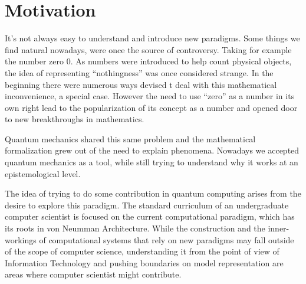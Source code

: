 \section{Motivation}
\label{sec:int_motivation}



It's not always easy to understand and introduce new paradigms. Some things we find natural nowadays, were once the source of controversy. Taking for example the number zero $0$. As numbers were introduced to help count physical objects, the idea of representing ``nothingness'' was once considered strange. In the beginning there were numerous ways devised t deal with this mathematical inconvenience, a special case. However the need to use ``zero'' as a number in its own right lead to the popularization of its concept as a number and opened door to new breakthroughs in mathematics\cite{Kaplan2000}. 

Quantum mechanics shared this same problem and the mathematical formalization grew out of the need to explain phenomena\cite{Mehra1982}. Nowadays we  accepted quantum mechanics as a tool, while still trying to understand why it works at an epistemological level. 

The idea of trying to do some contribution in quantum computing arises from the desire to explore this paradigm. The standard curriculum of an undergraduate computer scientist is focused on the current computational paradigm, which has its roots in von Neumman Architecture\cite{neumann45edvac}. While the construction and the inner-workings of computational systems that rely on new paradigms may fall outside of the scope of computer science, understanding it from the point of view of Information Technology and pushing boundaries on model representation are areas where computer scientist might contribute.



